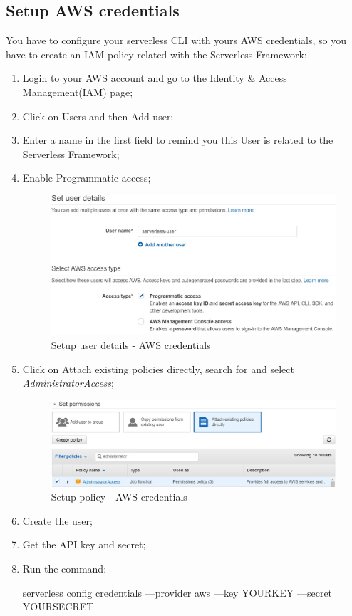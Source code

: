 \subsection{Setup AWS credentials}
You have to configure your serverless CLI with yours AWS credentials, so you have to create an IAM policy related with the Serverless Framework:
\begin{enumerate}
	\item Login to your AWS account and go to the Identity \& Access Management(IAM) page;
	\item Click on Users and then Add user;
	\item Enter a name in the first field to remind you this User is related to the Serverless Framework;
	\item Enable Programmatic access;
	\begin{figure}[H]
		\centering
		\includegraphics[scale=0.5]{../Img/setup1}
		\caption{Setup user details - AWS credentials}\label{}
	\end{figure}
	\item Click on Attach existing policies directly, search for and select \emph{AdministratorAccess};
	\begin{figure}[H]
		\centering
		\includegraphics[scale=0.5]{../Img/setup2}
		\caption{Setup policy - AWS credentials}\label{}
	\end{figure}
	\item Create the user;
	\item Get the API key and secret;
	\item Run the command:
	\begin{ttfamily}serverless config credentials ---provider aws ---key YOURKEY ---secret YOURSECRET\end{ttfamily}
\end{enumerate}

